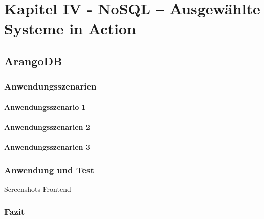 \chapter{Kapitel IV - NoSQL – Ausgewählte Systeme in Action}
\section{ArangoDB}
\subsection{Anwendungsszenarien}
\subsubsection{Anwendungsszenario 1}
\subsubsection{Anwendungsszenarien 2}
\subsubsection{Anwendungsszenarien 3}


\subsection{Anwendung und Test}
Screenshots Frontend 
\subsection{Fazit}